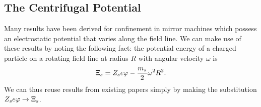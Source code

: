 \documentclass{revtex4-2}
\begin{document}
\subsection{The Centrifugal Potential}

Many results have been derived for confinement in mirror machines which possess an electrostatic potential that varies along the field line. We can make use of these results by noting the following fact: the potential energy of a charged particle on a rotating field line at radius $R$ with angular velocity $\omega$ is
\begin{equation}
\Xi_s = Z_s e \varphi - \frac{m_s}{2} \omega^2 R^2.
\end{equation}
We can thus reuse results from existing papers simply by making the substitution $Z_s e\varphi \rightarrow \Xi_s$.
\end{document}
